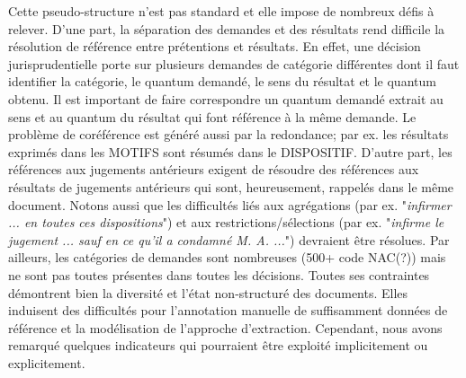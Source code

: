  Cette pseudo-structure n'est pas standard et elle impose de nombreux défis à relever. D'une part, la séparation des demandes et des résultats rend difficile la résolution de référence entre prétentions et résultats. En effet, une décision jurisprudentielle porte sur plusieurs demandes de catégorie différentes dont il faut identifier la catégorie, le quantum demandé, le sens du résultat et le quantum obtenu. Il est important de faire correspondre un quantum demandé extrait au sens et au quantum du résultat qui font référence à la même demande. Le problème de coréférence est généré aussi par la redondance; par ex. les résultats exprimés dans les MOTIFS sont résumés dans le DISPOSITIF. D'autre part, les références aux jugements antérieurs exigent de résoudre des références aux résultats de jugements antérieurs qui sont, heureusement, rappelés dans le même document. Notons aussi que les difficultés liés aux agrégations (par ex. "\textit{infirmer ... en toutes ces dispositions}") et aux restrictions/sélections (par ex. "\textit{infirme le jugement ... sauf en ce qu'il a condamné M. A. ...}") devraient être résolues. Par ailleurs, les catégories de demandes sont nombreuses (500+ code NAC(?)) mais ne sont pas toutes présentes dans toutes les décisions. Toutes ses contraintes démontrent bien la diversité et l'état non-structuré des documents. Elles induisent des difficultés pour l'annotation manuelle de suffisamment données de référence et la modélisation de l'approche d'extraction. Cependant, nous avons remarqué quelques indicateurs qui pourraient être exploité implicitement ou explicitement.

